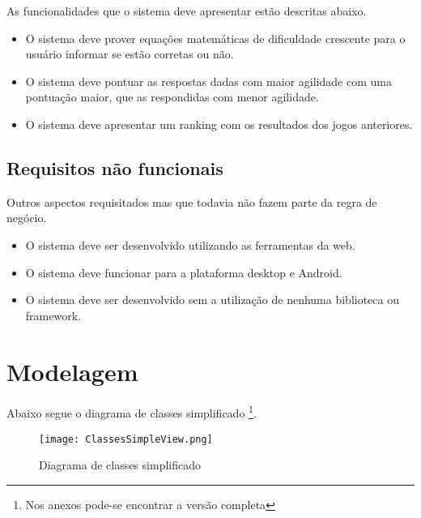 As funcionalidades que o sistema deve apresentar estão descritas abaixo.

\begin{itemize}
    \item O sistema deve prover equações matemáticas de dificuldade crescente para o usuário informar se estão corretas ou não.
    \item O sistema deve pontuar as respostas dadas com maior agilidade com uma pontuação maior, que as respondidas com menor agilidade.
    \item O sistema deve apresentar um ranking com os resultados dos  jogos anteriores.
\end{itemize}

\subsection{Requisitos não funcionais}

Outros aspectos requisitados mas que todavia não fazem parte da regra de negócio.

\begin{itemize}
    \item O sistema deve ser desenvolvido utilizando as ferramentas da web.
    \item O sistema deve funcionar para a plataforma desktop e Android.
    \item O sistema deve ser desenvolvido sem a utilização de nenhuma biblioteca ou framework.
\end{itemize}

\section{Modelagem}

Abaixo segue o diagrama de classes simplificado \footnote{Nos anexos pode-se encontrar a versão completa}.

\begin{figure}
    \centering
    \texttt{[image: ClassesSimpleView.png]}
	\caption{Diagrama de classes simplificado}
\end{figure}



